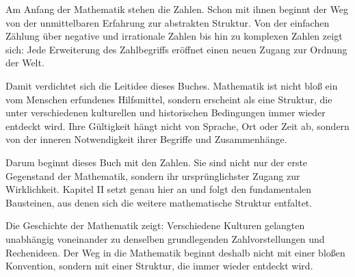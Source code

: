 Am Anfang der Mathematik stehen die Zahlen.
Schon mit ihnen beginnt der Weg von der unmittelbaren Erfahrung
zur abstrakten Struktur.
Von der einfachen Zählung über negative und irrationale Zahlen
bis hin zu komplexen Zahlen zeigt sich:
Jede Erweiterung des Zahlbegriffs eröffnet einen neuen Zugang zur Ordnung der Welt.

Damit verdichtet sich die Leitidee dieses Buches.
Mathematik ist nicht bloß ein vom Menschen erfundenes Hilfsmittel,
sondern erscheint als eine Struktur,
die unter verschiedenen kulturellen und historischen Bedingungen immer wieder entdeckt wird.
Ihre Gültigkeit hängt nicht von Sprache,
Ort oder Zeit ab,
sondern von der inneren Notwendigkeit ihrer Begriffe und Zusammenhänge.

Darum beginnt dieses Buch mit den Zahlen.
Sie sind nicht nur der erste Gegenstand der Mathematik,
sondern ihr ursprünglichster Zugang zur Wirklichkeit.
Kapitel II setzt genau hier an
und folgt den fundamentalen Bausteinen,
aus denen sich die weitere mathematische Struktur entfaltet.

\begin{NoteBox}
	\label{box:universelle}
	\small
	Die Geschichte der Mathematik zeigt:
	Verschiedene Kulturen gelangten unabhängig voneinander
	zu denselben grundlegenden Zahlvorstellungen und Rechenideen.
	Der Weg in die Mathematik beginnt deshalb nicht mit einer bloßen Konvention,
	sondern mit einer Struktur, die immer wieder entdeckt wird.
\end{NoteBox}
